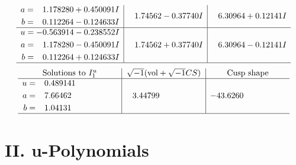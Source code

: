 \documentclass[1p]{elsarticle_modified}
\theoremstyle{definition}
\newcommand{\I}{\sqrt{-1}}
\begin{document}
$$\begin{array}{c|c|c}
\begin{aligned}
a &= \phantom{-}1.178280 + 0.450091 I \\
b &= \phantom{-}0.112264 - 0.124633 I\end{aligned}
 & \phantom{-}1.74562 - 0.37740 I & \phantom{-}6.30964 + 0.12141 I \\ \hline\begin{aligned}
u &= -0.563914 - 0.238552 I \\
a &= \phantom{-}1.178280 - 0.450091 I \\
b &= \phantom{-}0.112264 + 0.124633 I\end{aligned}
 & \phantom{-}1.74562 + 0.37740 I & \phantom{-}6.30964 - 0.12141 I\\
 \hline 
 \end{array}$$\newpage$$\begin{array}{c|c|c}  
\text{Solutions to }I^u_{1}& \I (\text{vol} + \sqrt{-1}CS) & \text{Cusp shape}\\
 \hline 
\begin{aligned}
u &= \phantom{-}0.489141\phantom{ +0.000000I} \\
a &= \phantom{-}7.66462\phantom{ +0.000000I} \\
b &= \phantom{-}1.04131\phantom{ +0.000000I}\end{aligned}
 & \phantom{-}3.44799\phantom{ +0.000000I} & -43.6260\phantom{ +0.000000I}\\
 \hline 
 \end{array}$$\newpage
\newpage\renewcommand{\arraystretch}{1}
\centering \section*{ II. u-Polynomials}
\end{document}

